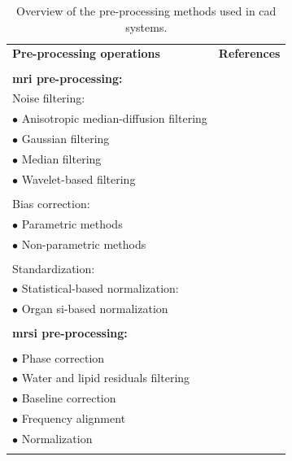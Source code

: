 \begin{table}
  \caption{Overview of the pre-processing methods used in \acs*{cad} systems.}
  \scriptsize
  \centering
  \begin{tabular}{l r}
    \toprule
    \textbf{Pre-processing operations} & \textbf{References} \\ \\ [-1.5ex]
    \midrule
    \textbf{\ac{mri} pre-processing:} & \\
    \quad Noise filtering: &  \\
    \quad \quad $\bullet$ Anisotropic median-diffusion filtering & \cite{rampun2015classifying,rampun2015computer,rampun2016computer,rampun2016computerb,rampun2016quantitative}  \\
    \quad \quad $\bullet$ Gaussian filtering & \cite{samarasinghe2016semi}  \\
    \quad \quad $\bullet$ Median filtering & \cite{Ozer2009,Ozer2010}  \\
    \quad \quad $\bullet$ Wavelet-based filtering & \cite{Ampeliotis2007,Ampeliotis2008,Lopes2011} \\ \\ [-1.5ex]
    \quad Bias correction: & \\
    \quad \quad $\bullet$ Parametric methods & \cite{Lv2009,Viswanath2009} \\
    \quad \quad $\bullet$ Non-parametric methods & \cite{Viswanath2011} \\ \\ [-1.5ex]
    \quad Standardization: & \\
    \quad \quad $\bullet$ Statistical-based normalization: & \cite{Artan2009,Artan2010,Lv2009,Ozer2009,Ozer2010,rampun2015classifying,rampun2015computer,rampun2016computer,rampun2016computerb,rampun2016quantitative,Viswanath2009,Viswanath2011,Viswanath2012} \\
    \quad \quad $\bullet$ Organ \ac{si}-based normalization & \cite{Niaf2011,Niaf2012,lehaire2014computer,samarasinghe2016semi} \\ \\ [-1.5ex]
    \textbf{\ac{mrsi} pre-processing:} & \\ \\ [-1.5ex]
    \quad $\bullet$ Phase correction & \cite{Parfait2012,trigui2016classification,trigui2017automatic} \\
    \quad $\bullet$ Water and lipid residuals filtering & \cite{Kelm2007} \\
    \quad $\bullet$ Baseline correction & \cite{Parfait2012,Tiwari2012,trigui2016classification,trigui2017automatic} \\
    \quad $\bullet$ Frequency alignment & \cite{Tiwari2012,trigui2016classification,trigui2017automatic} \\
    \quad $\bullet$ Normalization & \cite{Parfait2012,trigui2016classification,trigui2017automatic} \\ \\ [-1.5ex]
    \bottomrule
  \end{tabular}
\label{tab:summary-preproc}
\end{table}
